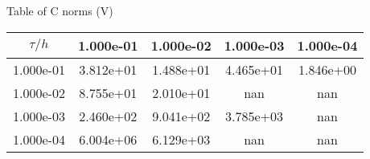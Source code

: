 \begin{center}
Table of C norms (V)
\\[2.0ex]  
  
\begin{tabular}{|c|c|c|c|c|} \hline
$\tau / h$ &1.000e-01 &1.000e-02 &1.000e-03 &1.000e-04 \\ \hline 
1.000e-01 &3.812e+01 &1.488e+01 &4.465e+01 &1.846e+00 \\ \hline 
1.000e-02 &8.755e+01 &2.010e+01 &nan &nan \\ \hline 
1.000e-03 &2.460e+02 &9.041e+02 &3.785e+03 &nan \\ \hline 
1.000e-04 &6.004e+06 &6.129e+03 &nan &nan \\ \hline 

\end{tabular}\\[20pt]
\end{center}
